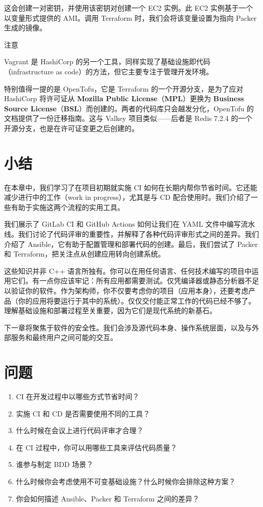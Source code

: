 \label{idx:984}
\label{idx:985}
这会创建一对密钥，并使用该密钥对创建一个 EC2 实例。此 EC2 实例基于一个以变量形式提供的 AMI。调用 Terraform 时，我们会将该变量设置为指向 Packer 生成的镜像。

\begin{myNotic}{注意}

Vagrant 是 HashiCorp 的另一个工具，同样实现了基础设施即代码（infrastructure as code）的方法，但它主要专注于管理开发环境。

\label{idx:986}
\label{idx:987}
特别值得一提的是 OpenTofu，它是 Terraform 的一个开源分支，是为了应对 HashiCorp 将许可证从 \textbf{Mozilla Public License}（\textbf{MPL}）更换为 \textbf{Business Source License}（\textbf{BSL}）而创建的。两者的代码库只会越发分化，OpenTofu 的文档提供了一份迁移指南。这与 Valkey 项目类似——后者是 Redis 7.2.4 的一个开源分支，也是在许可证变更之后创建的。
\end{myNotic}

\section{小结}

在本章中，我们学习了在项目初期就实施 CI 如何在长期内帮你节省时间。它还能减少进行中的工作（work in progress），尤其是与 CD 配合使用时。我们介绍了一些有助于实施这两个流程的实用工具。

我们展示了 GitLab CI 和 GitHub Actions 如何让我们在 YAML 文件中编写流水线。我们讨论了代码评审的重要性，并解释了各种代码评审形式之间的差异。我们介绍了 Ansible，它有助于配置管理和部署代码的创建。最后，我们尝试了 Packer 和 Terraform，把关注点从创建应用转向创建系统。

这些知识并非 C++ 语言所独有。你可以在用任何语言、任何技术编写的项目中运用它们。有一点你应该牢记：所有应用都需要测试。仅凭编译器或静态分析器不足以验证你的软件。作为架构师，你不仅要考虑你的项目（应用本身），还要考虑产品（你的应用将要运行于其中的系统）。仅仅交付能正常工作的代码已经不够了。理解基础设施和部署过程至关重要，因为它们是现代系统的新基石。

下一章将聚焦于软件的安全性。我们会涉及源代码本身、操作系统层面，以及与外部服务和最终用户之间可能的交互。

\section{问题}

\begin{enumerate}
\item CI 在开发过程中以哪些方式节省时间？
\item 实施 CI 和 CD 是否需要使用不同的工具？
\item 什么时候在会议上进行代码评审才合理？
\item 在 CI 过程中，你可以用哪些工具来评估代码质量？
\item 谁参与制定 BDD 场景？
\item 什么时候你会考虑使用不可变基础设施？什么时候你会排除这种方案？
\item 你会如何描述 Ansible、Packer 和 Terraform 之间的差异？
\end{enumerate}


